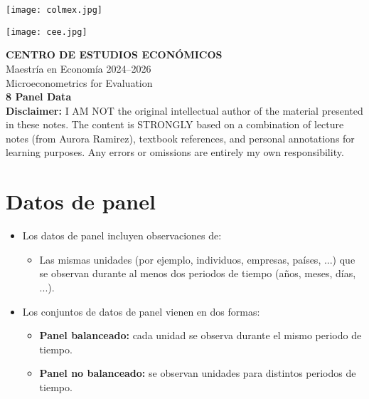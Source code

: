 \documentclass[12pt]{article}
\title{}
\author{}
\date{}
\begin{document}
\begin{titlepage}
    \vspace*{-1cm}
    \noindent
    \begin{minipage}[t]{0.49\textwidth}
        \texttt{[image: colmex.jpg]}
    \end{minipage}%
    \begin{minipage}[t]{0.49\textwidth}
        \raggedleft
        \texttt{[image: cee.jpg]}
    \end{minipage}

    \vspace*{2cm}

    \begin{center}
        \Huge \textbf{CENTRO DE ESTUDIOS ECONÓMICOS} \\[1.5em]
        \Large Maestría en Economía 2024--2026 \\[2em]
        \Large Microeconometrics for Evaluation \\[3em]
        \LARGE \textbf{8 Panel Data} \\[3em]
        \large \textbf{Disclaimer:} I AM NOT the original intellectual author of the material presented in these notes. The content is STRONGLY based on a combination of lecture notes (from Aurora Ramirez), textbook references, and personal annotations for learning purposes. Any errors or omissions are entirely my own responsibility.\\[0.9em]
        
    \end{center}

    \vfill
\end{titlepage}

\newpage

\setcounter{secnumdepth}{2}
\setcounter{tocdepth}{4}
\tableofcontents

\newpage

\section*{\noindent\textbf{Datos de panel}}

\begin{itemize}
    \item Los datos de panel incluyen observaciones de:
    \begin{itemize}
        \item Las mismas unidades (por ejemplo, individuos, empresas, países, ...) 
        que se observan durante al menos dos periodos de tiempo (años, meses, días, ...).
    \end{itemize}
    
    \item Los conjuntos de datos de panel vienen en dos formas:
    \begin{itemize}
        \item \textbf{Panel balanceado:} cada unidad se observa durante el mismo periodo de tiempo.
        \item \textbf{Panel no balanceado:} se observan unidades para distintos periodos de tiempo.
    \end{itemize}
\end{itemize}
\end{document}
